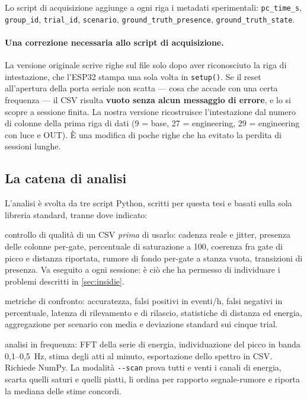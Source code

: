Lo script di acquisizione aggiunge a ogni riga i metadati sperimentali:
\texttt{pc\_time\_s}, \texttt{group\_id}, \texttt{trial\_id}, \texttt{scenario},
\texttt{ground\_truth\_presence}, \texttt{ground\_truth\_state}.

\paragraph{Una correzione necessaria allo script di acquisizione.} La versione
originale scrive righe sul file solo dopo aver riconosciuto la riga di intestazione,
che l'ESP32 stampa una sola volta in \texttt{setup()}. Se il reset all'apertura
della porta seriale non scatta --- cosa che accade con una certa frequenza --- il
CSV risulta \textbf{vuoto senza alcun messaggio di errore}, e lo si scopre a
sessione finita. La nostra versione ricostruisce l'intestazione dal numero di
colonne della prima riga di dati (9 = base, 27 = engineering, 29 = engineering con
luce e OUT). È una modifica di poche righe che ha evitato la perdita di sessioni
lunghe.

\subsection{La catena di analisi}
\label{sec:catena-analisi}

L'analisi è svolta da tre script Python, scritti per questa tesi e basati sulla
sola libreria standard, tranne dove indicato:

\begin{description}[leftmargin=1.4em,style=nextline,itemsep=3pt]
  \item[\texttt{analisi/verifica\_engineering.py}] controllo di qualità di un CSV
    \emph{prima} di usarlo: cadenza reale e jitter, presenza delle colonne per-gate,
    percentuale di saturazione a 100, coerenza fra gate di picco e distanza
    riportata, rumore di fondo per-gate a stanza vuota, transizioni di presenza. Va
    eseguito a ogni sessione: è ciò che ha permesso di individuare i problemi
    descritti in \cref{sec:insidie}.
  \item[\texttt{analisi/analizza\_test.py}] metriche di confronto: accuratezza,
    falsi positivi in eventi/h, falsi negativi in percentuale, latenza di
    rilevamento e di rilascio, statistiche di distanza ed energia, aggregazione per
    scenario con media e deviazione standard sui cinque trial.
  \item[\texttt{analisi/analizza\_respiro.py}] analisi in frequenza: FFT della
    serie di energia, individuazione del picco in banda 0,1--0,5~Hz, stima degli
    atti al minuto, esportazione dello spettro in CSV. Richiede NumPy. La modalità
    \texttt{-{}-scan} prova tutti e venti i canali di energia, scarta quelli saturi
    e quelli piatti, li ordina per rapporto segnale-rumore e riporta la mediana
    delle stime concordi.
\end{description}

